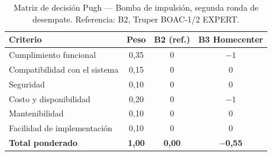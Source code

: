 \begin{table}[H]
\centering
\caption{Matriz de decisión Pugh --- Bomba de impulsión, segunda ronda de desempate. Referencia: B2, Truper BOAC-1/2 EXPERT.}
\label{tab:pugh-bomba-r2}
\begin{tabularx}{\textwidth}{Xccc}
\toprule
\textbf{Criterio} & \textbf{Peso} & \textbf{B2 (ref.)} & \textbf{B3 Homecenter} \\
\midrule
Cumplimiento funcional        & 0,35 & 0 & $-1$ \\
Compatibilidad con el sistema & 0,15 & 0 & 0 \\
Seguridad                     & 0,10 & 0 & 0 \\
Costo y disponibilidad        & 0,20 & 0 & $-1$ \\
Mantenibilidad                & 0,10 & 0 & 0 \\
Facilidad de implementación   & 0,10 & 0 & 0 \\
\midrule
\textbf{Total ponderado}      & \textbf{1,00} & \textbf{0,00} & \textbf{$-$0,55} \\
\bottomrule
\end{tabularx}
\end{table}
